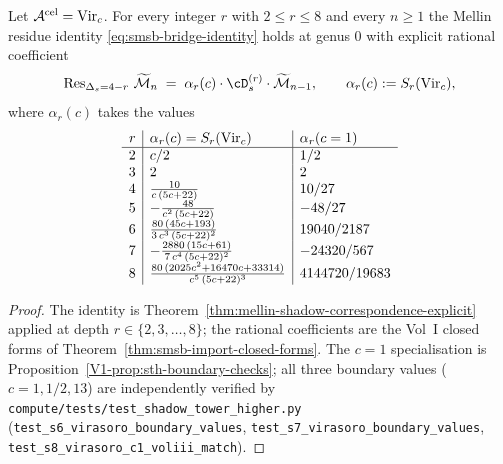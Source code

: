 \begin{theorem}
\label{thm:soft-hierarchy-r-leq-8}
\ClaimStatusProvedHere
Let $\mathcal A^{\mathrm{cel}} = \mathrm{Vir}_c$. For every integer $r$ with
$2 \leq r \leq 8$ and every $n \geq 1$ the Mellin residue identity
\eqref{eq:smsb-bridge-identity} holds at genus $0$ with explicit
rational coefficient
\begin{equation}
\label{eq:smsb-r-coefficient-table}
 \Res_{\Delta_s = 4 - r}\,\Mel\cM_n
 \;=\;
 \alpha_r(c)\cdot \cD_s^{(r)}\cdot \Mel\cM_{n - 1},
 \qquad
 \alpha_r(c) := S_r(\Vir_c),
\end{equation}
where $\alpha_r(c)$ takes the values
\[
 \begin{array}{r|l|l}
 r & \alpha_r(c) = S_r(\mathrm{Vir}_c) & \alpha_r(c = 1) \\ \hline
 2 & c / 2 & 1/2 \\
 3 & 2 & 2 \\
 4 & \tfrac{10}{c\,(5 c + 22)} & 10/27 \\
 5 & -\tfrac{48}{c^{2}\,(5 c + 22)} & -48/27 \\
 6 & \tfrac{80\,(45 c + 193)}{3\, c^{3}\,(5 c + 22)^{2}} & 19040 / 2187 \\
 7 & -\tfrac{2880\,(15 c + 61)}{7\, c^{4}\,(5 c + 22)^{2}} & -24320 / 567 \\
 8 & \tfrac{80\,(2025 c^{2} + 16470 c + 33314)}{c^{5}\,(5 c + 22)^{3}}
 & 4144720 / 19683
 \end{array}
\]
\end{theorem}

\begin{proof}
The identity is
Theorem~\ref{thm:mellin-shadow-correspondence-explicit} applied at
depth $r \in \{2, 3, \ldots, 8\}$; the rational coefficients are the
Vol~I closed forms of Theorem~\ref{thm:smsb-import-closed-forms}. The
$c = 1$ specialisation is
Proposition~\ref{V1-prop:sth-boundary-checks}; all three boundary values
($c = 1, 1/2, 13$) are independently verified by
\texttt{compute/tests/test\_shadow\_tower\_higher.py}
(\texttt{test\_s6\_virasoro\_boundary\_values},
\texttt{test\_s7\_virasoro\_boundary\_values},
\texttt{test\_s8\_virasoro\_c1\_voliii\_match}).
\end{proof}

